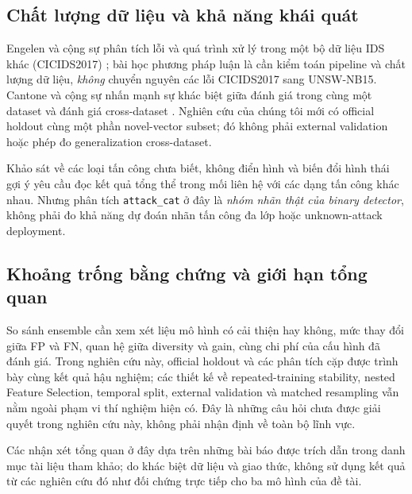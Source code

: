 \subsection{Chất lượng dữ liệu và khả năng khái quát}
Engelen và cộng sự phân tích lỗi và quá trình xử lý trong một bộ dữ liệu IDS khác (CICIDS2017) \cite{legacyL02}; bài học phương pháp luận là cần kiểm toán pipeline và chất lượng dữ liệu, \emph{không} chuyển nguyên các lỗi CICIDS2017 sang UNSW-NB15. Cantone và cộng sự nhấn mạnh sự khác biệt giữa đánh giá trong cùng một dataset và đánh giá cross-dataset \cite{legacyL09}. Nghiên cứu của chúng tôi mới có official holdout cùng một phần novel-vector subset; đó không phải external validation hoặc phép đo generalization cross-dataset.

Khảo sát về các loại tấn công chưa biết, không điển hình và biến đổi hình thái \cite{legacyL10} gợi ý yêu cầu đọc kết quả tổng thể trong mối liên hệ với các dạng tấn công khác nhau. Nhưng phân tích \texttt{attack\_cat} ở đây là \emph{nhóm nhãn thật của binary detector}, không phải đo khả năng dự đoán nhãn tấn công đa lớp hoặc unknown-attack deployment.

\subsection{Khoảng trống bằng chứng và giới hạn tổng quan}
So sánh ensemble cần xem xét liệu mô hình có cải thiện hay không, mức thay đổi giữa FP và FN, quan hệ giữa diversity và gain, cùng chi phí của cấu hình đã đánh giá. Trong nghiên cứu này, official holdout và các phân tích cặp được trình bày cùng kết quả hậu nghiệm; các thiết kế về repeated-training stability, nested Feature Selection, temporal split, external validation và matched resampling vẫn nằm ngoài phạm vi thí nghiệm hiện có. Đây là những câu hỏi chưa được giải quyết trong nghiên cứu này, không phải nhận định về toàn bộ lĩnh vực.

Các nhận xét tổng quan ở đây dựa trên những bài báo được trích dẫn trong danh mục tài liệu tham khảo; do khác biệt dữ liệu và giao thức, không sử dụng kết quả từ các nghiên cứu đó như đối chứng trực tiếp cho ba mô hình của đề tài.
